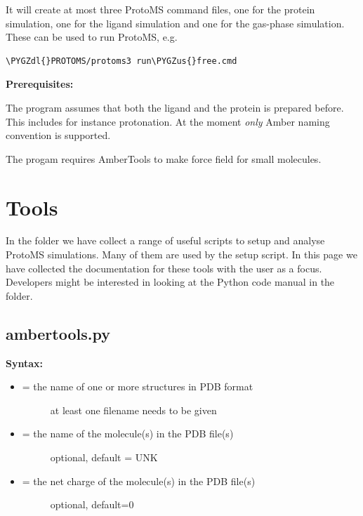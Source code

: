 \documentclass[letterpaper,10pt,english]{sphinxmanual}
\def\PYGZus{\char`\_}
\def\PYGZdl{\char`\$}
\begin{document}
It will create at most three ProtoMS command files, one for the protein simulation, one for the ligand simulation and one for the gas-phase simulation. These can be used to run ProtoMS, e.g.

\begin{Verbatim}[commandchars=\\\{\}]
\PYGZdl{}PROTOMS/protoms3 run\PYGZus{}free.cmd
\end{Verbatim}

\textbf{Prerequisites:}

The program assumes that both the ligand and the protein is prepared before. This includes for instance protonation. At the moment \emph{only} Amber naming convention is supported.

The progam requires AmberTools to make force field for small molecules.


\chapter{Tools}
\label{tools:tools}\label{tools::doc}
In the  folder we have collect a range of useful scripts to setup and analyse ProtoMS simulations. Many of them are used by the  setup script. In this page we have collected the documentation for these tools with the user as a focus. Developers might be interested in looking at the Python code manual in the  folder.


\section{ambertools.py}
\label{tools:ambertools-py}
\textbf{Syntax:}

\begin{itemize}
\item {} \begin{description}
\item[{ = the name of one or more structures in PDB format}] \leavevmode
at least one filename needs to be given

\end{description}

\item {} \begin{description}
\item[{ = the name of the molecule(s) in the PDB file(s)}] \leavevmode
optional, default = UNK

\end{description}

\item {} \begin{description}
\item[{ = the net charge of the molecule(s) in the PDB file(s)}] \leavevmode
optional, default=0

\end{description}

\end{itemize}
\end{document}
